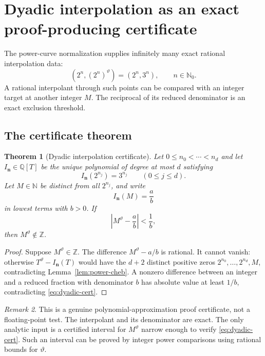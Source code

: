 \documentclass[11pt,oneside]{article}
\newtheorem{theorem}{Theorem}[section]
\theoremstyle{definition}
\theoremstyle{remark}
\newtheorem{remark}[theorem]{Remark}
\newcommand{\N}{\mathbb N}
\newcommand{\Nzero}{\mathbb N_0}
\newcommand{\Z}{\mathbb Z}
\newcommand{\Q}{\mathbb Q}
\newcommand{\thetaq}{\vartheta}
\begin{document}
\section{Dyadic interpolation as an exact proof-producing certificate}
\label{sec:dyadic-cert}

The power-curve normalization supplies infinitely many exact rational interpolation data:
\[
 (2^n,(2^n)^{\thetaq})=(2^n,3^n),\qquad n\in\Nzero.
\]
A rational interpolant through such points can be compared with an integer target at another
integer $M$.  The reciprocal of its reduced denominator is an exact exclusion threshold.

\subsection{The certificate theorem}

\begin{theorem}[Dyadic interpolation certificate]
\label{thm:dyadic-certificate}
Let $0\le n_0<\cdots<n_d$ and let $I_{\mathbf n}\in\Q[T]$ be the unique polynomial of degree
at most $d$ satisfying
\[
 I_{\mathbf n}(2^{n_j})=3^{n_j}\qquad(0\le j\le d).
\]
Let $M\in\N$ be distinct from all $2^{n_j}$, and write
\[
 I_{\mathbf n}(M)=\frac ab
\]
in lowest terms with $b>0$.  If
\begin{equation}
 \left|M^{\thetaq}-\frac ab\right|<\frac1b,
 \label{eq:dyadic-cert}
\end{equation}
then $M^{\thetaq}\notin\Z$.
\end{theorem}

\begin{proof}
Suppose $M^{\thetaq}\in\Z$.  The difference
$M^{\thetaq}-a/b$ is rational.  It cannot vanish: otherwise
$T^{\thetaq}-I_{\mathbf n}(T)$ would have the $d+2$ distinct positive zeros
$2^{n_0},\ldots,2^{n_d},M$, contradicting Lemma~\ref{lem:power-cheb}.  A nonzero difference
between an integer and a reduced fraction with denominator $b$ has absolute value at least
$1/b$, contradicting \eqref{eq:dyadic-cert}.
\end{proof}

\begin{remark}
This is a genuine polynomial-approximation proof certificate, not a floating-point test.  The
interpolant and its denominator are exact.  The only analytic input is a certified interval
for $M^{\thetaq}$ narrow enough to verify \eqref{eq:dyadic-cert}.  Such an interval can be
proved by integer power comparisons using rational bounds for $\thetaq$.
\end{remark}
\end{document}
